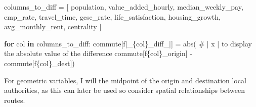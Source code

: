 \documentclass[
  number]{elsarticle}
\newenvironment{Shaded}{\begin{snugshade}}{\end{snugshade}}
\newcommand{\BuiltInTok}[1]{\textcolor[rgb]{0.00,0.23,0.31}{#1}}
\newcommand{\CommentTok}[1]{\textcolor[rgb]{0.37,0.37,0.37}{#1}}
\newcommand{\ControlFlowTok}[1]{\textcolor[rgb]{0.00,0.23,0.31}{\textbf{#1}}}
\newcommand{\KeywordTok}[1]{\textcolor[rgb]{0.00,0.23,0.31}{\textbf{#1}}}
\newcommand{\NormalTok}[1]{\textcolor[rgb]{0.00,0.23,0.31}{#1}}
\newcommand{\OperatorTok}[1]{\textcolor[rgb]{0.37,0.37,0.37}{#1}}
\newcommand{\SpecialCharTok}[1]{\textcolor[rgb]{0.37,0.37,0.37}{#1}}
\newcommand{\SpecialStringTok}[1]{\textcolor[rgb]{0.13,0.47,0.30}{#1}}
\newcommand{\StringTok}[1]{\textcolor[rgb]{0.13,0.47,0.30}{#1}}
\begin{document}
\begin{Shaded}
\begin{Highlighting}[]
\NormalTok{columns\_to\_diff }\OperatorTok{=}\NormalTok{ [}
    \StringTok{\textquotesingle{}population\textquotesingle{}}\NormalTok{,}
    \StringTok{\textquotesingle{}value\_added\_hourly\textquotesingle{}}\NormalTok{,}
    \StringTok{\textquotesingle{}median\_weekly\_pay\textquotesingle{}}\NormalTok{,}
    \StringTok{\textquotesingle{}emp\_rate\textquotesingle{}}\NormalTok{,}
    \StringTok{\textquotesingle{}travel\_time\textquotesingle{}}\NormalTok{,}
    \StringTok{\textquotesingle{}gcse\_rate\textquotesingle{}}\NormalTok{,}
    \StringTok{\textquotesingle{}life\_satisfaction\textquotesingle{}}\NormalTok{,}
    \StringTok{\textquotesingle{}housing\_growth\textquotesingle{}}\NormalTok{,}
    \StringTok{\textquotesingle{}avg\_monthly\_rent\textquotesingle{}}\NormalTok{,}
    \StringTok{\textquotesingle{}centrality\textquotesingle{}}
\NormalTok{]}

\ControlFlowTok{for}\NormalTok{ col }\KeywordTok{in}\NormalTok{ columns\_to\_diff:}
\NormalTok{    commute[}\SpecialStringTok{f\textquotesingle{}|\_}\SpecialCharTok{\{}\NormalTok{col}\SpecialCharTok{\}}\SpecialStringTok{\_diff\_|\textquotesingle{}}\NormalTok{] }\OperatorTok{=} \BuiltInTok{abs}\NormalTok{( }\CommentTok{\# | x | to display the absolute value of the difference}
\NormalTok{        commute[}\SpecialStringTok{f\textquotesingle{}}\SpecialCharTok{\{}\NormalTok{col}\SpecialCharTok{\}}\SpecialStringTok{\_origin\textquotesingle{}}\NormalTok{] }\OperatorTok{{-}}\NormalTok{ commute[}\SpecialStringTok{f\textquotesingle{}}\SpecialCharTok{\{}\NormalTok{col}\SpecialCharTok{\}}\SpecialStringTok{\_dest\textquotesingle{}}\NormalTok{])}
\end{Highlighting}
\end{Shaded}

For geometric variables, I will the midpoint of the origin and
destination local authorities, as this can later be used so consider
spatial relationships between routes.
\end{document}
